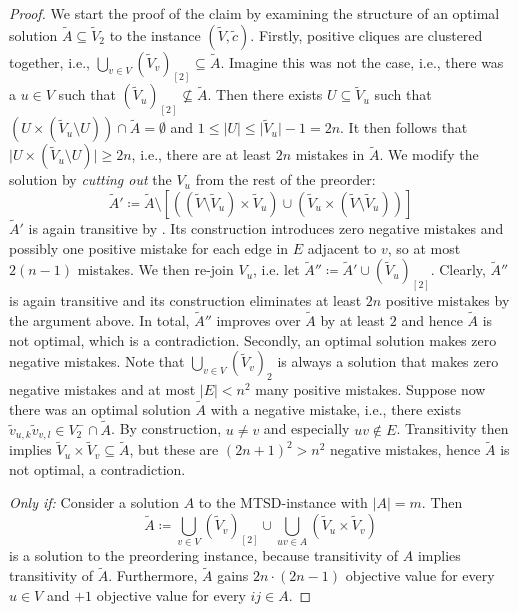 \begin{proof}
	We start the proof of the claim by examining the structure of an optimal solution $\tilde{A} \subseteq \tilde{V}_{2}$ to the instance $(\tilde{V}, \tilde{c})$.
	Firstly, positive cliques are clustered together, i.e., $\bigcup_{v \in V}^{} (\tilde{V}_{v})_{\left[ 2 \right]} \subseteq \tilde{A}$.
	Imagine this was not the case, i.e., there was a $u \in V$ such that $(\tilde{V}_{u})_{\left[ 2 \right]} \nsubseteq \tilde{A}$.
	Then there exists $U \subseteq \tilde{V}_{u}$ such that $( U \times (\tilde{V}_{u} \setminus U)) \cap \tilde{A} = \emptyset$
	and $1 \leq \lvert U \rvert \leq \lvert  \tilde{V}_{u} \rvert - 1 = 2n$.
	It then follows that $\lvert  U \times (\tilde{V}_{u} \setminus U) \rvert \geq 2n$, i.e., there are at least $2n$ mistakes in $\tilde{A}$.
	We modify the solution by \emph{cutting out} the $V_{u}$ from the rest of the preorder:
	\[
		\tilde{A}' \coloneqq  \tilde{A}
		\setminus
		\left[ \left( (\tilde{V} \setminus \tilde{V}_{u}) \times \tilde{V}_{u} \right) \cup \left( \tilde{V}_{u} \times (\tilde{V} \setminus \tilde{V}_{u}) \right) \right]
	\]
	$\tilde{A}'$ is again transitive by .
	Its construction introduces zero negative mistakes and possibly one positive mistake for each edge in $E$ adjacent to $v$, so at most $2(n - 1)$ mistakes.
	We then re-join $V_{u}$, i.e. let $\tilde{A}'' \coloneqq \tilde{A}' \cup (\tilde{V}_{u})_{\left[ 2 \right]}$.
	Clearly, $\tilde{A}''$ is again transitive and its construction eliminates at least $2n$ positive mistakes by the argument above.
	In total, $\tilde{A}''$ improves over $\tilde{A}$ by at least $2$ and hence $\tilde{A}$ is not optimal, which is a contradiction.
	Secondly, an optimal solution makes zero negative mistakes.
	Note that $\bigcup_{v \in V}^{} (\tilde{V}_{v})_{2}$ is always a solution that makes zero negative mistakes and at most $\lvert E \rvert < n^{2}$ many positive mistakes.
	Suppose now there was an optimal solution $\tilde{A}$ with a negative mistake, i.e., there exists $\tilde{v}_{u,k}\tilde{v}_{v,l} \in V_{2}^{-} \cap \tilde{A}$.
	By construction, $u \neq v$ and especially $uv \notin E$.
	Transitivity then implies $\tilde{V}_{u} \times \tilde{V}_{v} \subseteq \tilde{A}$, but these are $(2n+1)^{2} > n^{2}$ negative mistakes, hence $\tilde{A}$ is not optimal, a contradiction.

	\textit{Only if:} Consider a solution $A$ to the \textsc{MTSD}-instance with $\lvert A \rvert = m$. Then
	\[
		\tilde{A} \coloneqq \bigcup_{v \in V} (\tilde{V}_{v})_{\left[ 2 \right]} \cup \bigcup_{uv \in A} (\tilde{V}_{u} \times \tilde{V}_{v})
	\]
	is a solution to the preordering instance, because transitivity of $A$ implies transitivity of $\tilde{A}$.
	Furthermore, $\tilde{A}$ gains $2n \cdot (2n - 1)$ objective value for every $u \in V$ and $+1$ objective value for every $ij \in A$.


\end{proof}
